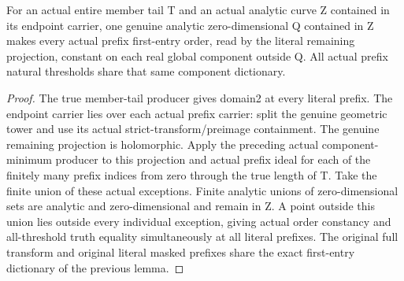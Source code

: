 \begin{theorem}
\label{hir:member-lower-order-actual-prefix-history}
\leanok
For an actual entire member tail T and an actual analytic curve Z contained in
its endpoint carrier, one genuine analytic zero-dimensional Q contained in Z
makes every actual prefix first-entry order, read by the literal remaining
projection, constant on each real global component outside Q. All actual
prefix natural thresholds share that same component dictionary.
\end{theorem}
\begin{proof}
The true member-tail producer gives domain2 at every literal prefix. The
endpoint carrier lies over each actual prefix carrier: split the genuine
geometric tower and use its actual strict-transform/preimage containment.
The genuine remaining projection is holomorphic. Apply the preceding actual
component-minimum producer to this projection and actual prefix ideal for each
of the finitely many prefix indices from zero through the true length of T.
Take the finite union of these actual exceptions. Finite analytic unions of
zero-dimensional sets are analytic and zero-dimensional and remain in Z.
A point outside this union lies outside every individual exception, giving
actual order constancy and all-threshold truth equality simultaneously at all
literal prefixes. The original full transform and original literal masked
prefixes share the exact first-entry dictionary of the previous lemma.
\end{proof}


